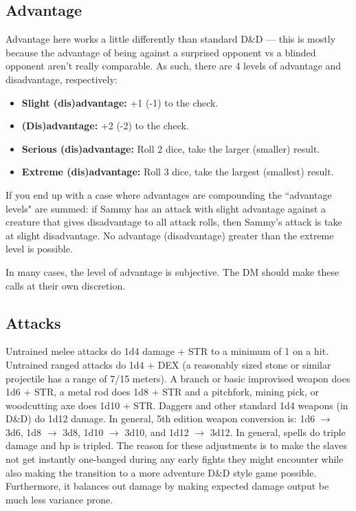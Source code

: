 \documentclass[letterpaper,12pt]{article}
\begin{document}
\subsection{Advantage}

Advantage here works a little differently than standard D\&D --- this is mostly because the advantage of being against a surprised opponent vs a blinded opponent aren't really comparable. As such, there are 4 levels of advantage and disadvantage, respectively: 

\begin{itemize}
\item \textbf{Slight (dis)advantage:} +1 (-1) to the check.
\item \textbf{(Dis)advantage:} +2 (-2) to the check. 
\item \textbf{Serious (dis)advantage:} Roll 2 dice, take the larger (smaller) result.
\item \textbf{Extreme (dis)advantage:} Roll 3 dice, take the largest (smallest) result.
\end{itemize}

If you end up with a case where advantages are compounding the ``advantage levels" are summed: if Sammy has an attack with slight advantage against a creature that gives disadvantage to all attack rolls, then Sammy's attack is take at slight disadvantage. No advantage (disadvantage) greater than the extreme level is possible.   

In many cases, the level of advantage is subjective. The DM should make these calls at their own discretion.

\subsection{Attacks}

 Untrained melee attacks do 1d4 damage + STR to a minimum of 1 on a hit. Untrained ranged attacks do 1d4 + DEX (a reasonably sized stone or similar projectile has a range of 7/15 meters). A branch or basic improvised weapon does 1d6 + STR, a metal rod does 1d8 + STR and a pitchfork, mining pick, or woodcutting axe does 1d10 + STR. Daggers and other standard 1d4 weapons (in D\&D) do 1d12 damage. In general, 5th edition weapon conversion is: 1d6 $\rightarrow$ 3d6, 1d8 $\rightarrow$ 3d8, 1d10 $\rightarrow$ 3d10, and 1d12 $\rightarrow$ 3d12. In general, spells do triple damage and hp is tripled. The reason for these adjustments is to make the slaves not get instantly one-banged during any early fights they might encounter while also making the transition to a more adventure D\&D style game possible. Furthermore, it balances out damage by making expected damage output be much less variance prone. 
\end{document}
